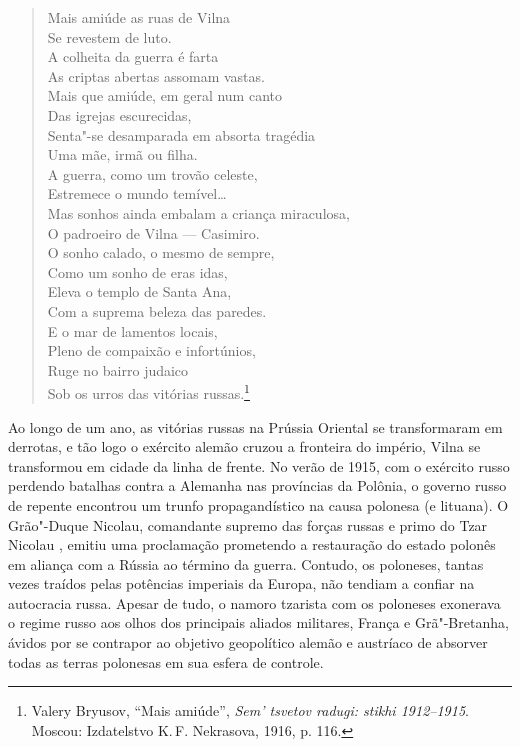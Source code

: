 %

\pagebreak

\begin{verse}
Mais amiúde as ruas de Vilna\\
Se revestem de luto.\\
A colheita da guerra é farta\\
As criptas abertas assomam vastas.\\[10pt]
Mais que amiúde, em geral num canto\\
Das igrejas escurecidas,\\
Senta"-se desamparada em absorta tragédia\\
Uma mãe, irmã ou filha.\\[10pt]
A guerra, como um trovão celeste,\\
Estremece o mundo temível\ldots{}\\
Mas sonhos ainda embalam a criança miraculosa,\\
O padroeiro de Vilna --- Casimiro.\\[10pt]
O sonho calado, o mesmo de sempre,\\
Como um sonho de eras idas,\\
Eleva o templo de Santa Ana,\\
Com a suprema beleza das paredes.\\[10pt]
E o mar de lamentos locais,\\
Pleno de compaixão e infortúnios,\\
Ruge no bairro judaico\\
Sob os urros das vitórias russas.\footnote{Valery Bryusov, ``Mais amiúde'', \emph{Sem' tsvetov radugi: stikhi 1912--1915}. Moscou: Izdatelstvo K.\,F. Nekrasova, 1916, p. 116.}
\end{verse}

Ao longo de um ano, as vitórias russas na Prússia Oriental se
transformaram em derrotas, e tão logo o exército alemão cruzou a
fronteira do império, Vilna se transformou em cidade da linha de frente.
No verão de 1915, com o exército russo perdendo batalhas contra a
Alemanha nas províncias da Polônia, o governo russo de repente encontrou
um trunfo propagandístico na causa polonesa (e lituana). O Grão"-Duque
Nicolau, comandante supremo das forças russas e primo do Tzar Nicolau
, emitiu uma proclamação prometendo a restauração do estado polonês em
aliança com a Rússia ao término da guerra. Contudo, os poloneses, tantas
vezes traídos pelas potências imperiais da Europa, não tendiam a confiar
na autocracia russa. Apesar de tudo, o namoro tzarista com os poloneses
exonerava o regime russo aos olhos dos principais aliados militares,
França e Grã"-Bretanha, ávidos por se contrapor ao objetivo geopolítico
alemão e austríaco de absorver todas as terras polonesas em sua esfera
de controle.

